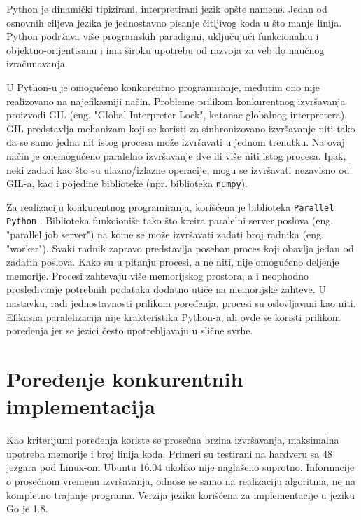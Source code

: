 \documentclass[12pt,oneside]{memoir}
\begin{document}
Python je dinamički tipizirani, interpretirani jezik opšte namene. Jedan od osnovnih ciljeva jezika je jednostavno pisanje čitljivog koda u što manje linija. Python podržava više programskih paradigmi, uključujući funkcionalnu i objektno-orijentisanu i ima široku upotrebu od razvoja za veb do naučnog izračunavanja. 

\label{gil}
U Python-u je omogućeno konkurentno programiranje, međutim ono nije realizovano na najefikasniji način. Probleme prilikom konkurentnog izvršavanja proizvodi GIL (eng. "Global Interpreter Lock", katanac globalnog interpretera). GIL predstavlja mehanizam koji se koristi za sinhronizovano izvršavanje niti tako da se samo jedna nit istog procesa može izvršavati u jednom trenutku. Na ovaj način je onemogućeno paralelno izvršavanje dve ili više niti istog procesa. Ipak, neki zadaci kao što su ulazno/izlazne operacije, mogu se izvršavati nezavisno od GIL-a, kao i pojedine biblioteke (npr. biblioteka \texttt{numpy}).

Za realizaciju konkurentnog programiranja, korišćena je biblioteka \texttt{Parallel Python} \cite{pp}. Biblioteka funkcioniše tako što kreira paralelni server poslova (eng. "parallel job server") na kome se može izvršavati zadati broj radnika (eng. "worker"). Svaki radnik zapravo predstavlja poseban proces koji obavlja jedan od zadatih poslova. Kako su u pitanju procesi, a ne niti, nije omogućeno deljenje memorije. Procesi zahtevaju više memorijskog prostora, a i neophodno prosleđivanje potrebnih podataka dodatno utiče na memorijske zahteve. U nastavku, radi jednostavnosti prilikom poređenja, procesi su oslovljavani kao niti. Efikasna paralelizacija nije krakteristika Python-a, ali ovde se koristi prilikom poređenja jer se jezici često upotrebljavaju u slične svrhe.

\section{Poređenje konkurentnih implementacija}
Kao kriterijumi poređenja koriste se prosečna brzina izvršavanja, maksimalna upotreba memorije i broj linija koda. Primeri su testirani na hardveru sa 48 jezgara pod Linux-om Ubuntu 16.04 ukoliko nije naglašeno suprotno. Informacije o prosečnom vremenu izvršavanja, odnose se samo na realizaciju algoritma, ne na kompletno trajanje programa. Verzija jezika korišćena za implementacije u jeziku Go je 1.8.
\end{document}
